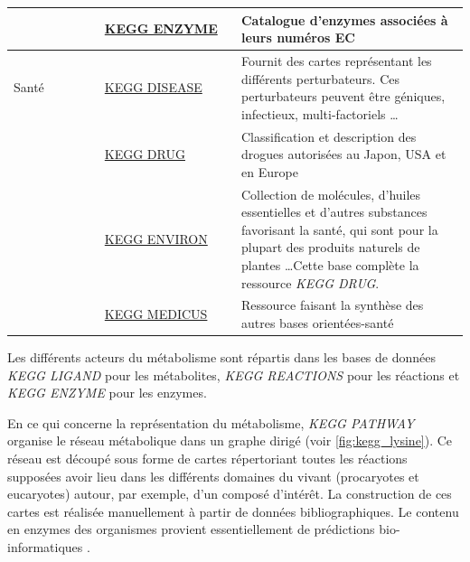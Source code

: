 \begin{refsegment}
\begin{table}[H]
\begin{tabular}{p{0.2\linewidth}|p{0.3\linewidth}|p{0.5\linewidth}}
            \cline{2-3}             & \href{http://www.genome.jp/kegg/annotation/enzyme.html}{KEGG ENZYME}  & Catalogue d'enzymes associées                                                                                                                                                                                                                                                                                               à leurs numéros \acrfull{EC}\\
            \hline
            Santé                   & \href{http://www.genome.jp/kegg/disease/}{KEGG DISEASE}               & Fournit des cartes représentant les différents perturbateurs. Ces perturbateurs peuvent être géniques, infectieux, multi-factoriels \ldots\\
            \cline{2-3}             & \href{http://www.genome.jp/kegg/drug/}{KEGG DRUG}                     & Classification et description des drogues autorisées au Japon, USA et en Europe\\
            \cline{2-3}             & \href{http://www.genome.jp/kegg/drug/environ.html}{KEGG ENVIRON}      & Collection de molécules, d'huiles essentielles et d'autres substances favorisant la santé, qui sont pour la plupart des produits naturels de plantes \ldots Cette base complète la ressource \textit{KEGG DRUG}.\\
            \cline{2-3}             & \href{http://www.genome.jp/kegg/medicus.html}{KEGG MEDICUS}           & Ressource faisant la synthèse des autres  bases orientées-santé \\
            \bottomrule
        \end{tabular}
    \end{table}
    
    
    Les différents acteurs du métabolisme sont répartis dans les bases de données \textit{KEGG LIGAND} pour les métabolites, \textit{KEGG REACTIONS} pour les réactions et \textit{KEGG ENZYME} pour les enzymes.
    
    En ce qui concerne la représentation du métabolisme, \textit{KEGG PATHWAY} organise le réseau métabolique dans un graphe dirigé (voir \cref{fig:kegg_lysine}). Ce réseau est découpé sous forme de cartes répertoriant toutes les réactions supposées avoir lieu dans les différents domaines du vivant (procaryotes et eucaryotes) autour, par exemple, d’un composé d’intérêt. La construction de ces cartes est réalisée manuellement à partir de données bibliographiques. Le contenu en enzymes des organismes provient essentiellement de prédictions bio-informatiques .
    

\end{refsegment}
